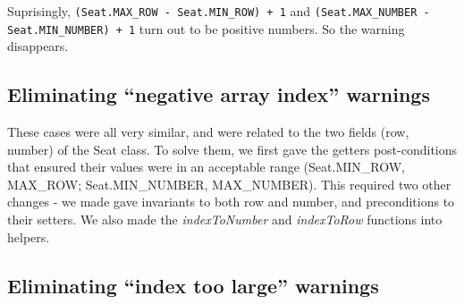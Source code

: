 \documentclass{article}
\begin{document}
Suprisingly, \verb|(Seat.MAX_ROW - Seat.MIN_ROW) + 1| and \verb|(Seat.MAX_NUMBER - Seat.MIN_NUMBER) + 1| turn
out to be positive numbers. So the warning disappears.

\subsection{Eliminating ``negative array index'' warnings}

These cases were all very similar, and were related to the two fields (row, number) of the Seat class. To solve them, we first gave the getters post-conditions that ensured their values were in an acceptable range (Seat.MIN\_ROW, MAX\_ROW; Seat.MIN\_NUMBER, MAX\_NUMBER). This required two other changes - we made gave invariants to both row and number, and preconditions to their setters. We also made the \emph{indexToNumber} and \emph{indexToRow} functions into helpers.

\subsection{Eliminating ``index too large'' warnings}
\end{document}
